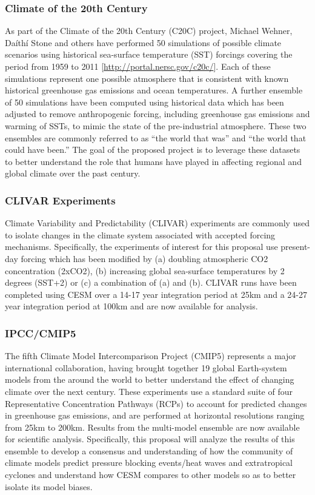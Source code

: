 \documentclass[11pt]{article}
\begin{document}
\subsubsection*{Climate of the 20th Century} \label{sec:EnsembleData}

As part of the Climate of the 20th Century (C20C) project, Michael Wehner, Da\'ith\'i Stone and others have performed 50 simulations of possible climate scenarios using historical sea-surface temperature (SST) forcings covering the period from 1959 to 2011 [\url{http://portal.nersc.gov/c20c/}].  Each of these simulations represent one possible atmosphere that is consistent with known historical greenhouse gas emissions and ocean temperatures.  A further ensemble of 50 simulations have been computed using historical data which has been adjusted to remove anthropogenic forcing, including greenhouse gas emissions and warming of SSTs, to mimic the state of the pre-industrial atmosphere.  These two ensembles are commonly referred to as ``the world that was'' and ``the world that could have been.''  The goal of the proposed project is to leverage these datasets to better understand the role that humans have played in affecting regional and global climate over the past century.

\subsubsection*{CLIVAR Experiments} \label{sec:CLIVAR}

Climate Variability and Predictability (CLIVAR) experiments are commonly used to isolate changes in the climate system associated with accepted forcing mechanisms.  Specifically, the experiments of interest for this proposal use present-day forcing which has been modified by (a) doubling atmospheric CO2 concentration (2xCO2), (b) increasing global sea-surface temperatures by 2 degrees (SST+2) or (c) a combination of (a) and (b).  CLIVAR runs have been completed using CESM over a 14-17 year integration period at 25km and a 24-27 year integration period at 100km and are now available for analysis.

\subsubsection*{IPCC/CMIP5} \label{sec:IPCC-CMIP5}

The fifth Climate Model Intercomparison Project (CMIP5) represents a major international collaboration, having brought together 19 global Earth-system models from the around the world to better understand the effect of changing climate over the next century.  These experiments use a standard suite of four Representative Concentration Pathways (RCPs) to account for predicted changes in greenhouse gas emissions, and are performed at horizontal resolutions ranging from 25km to 200km.  Results from the multi-model ensemble are now available for scientific analysis.  Specifically, this proposal will analyze the results of this ensemble to develop a consensus and understanding of how the community of climate models predict pressure blocking events/heat waves and extratropical cyclones and understand how CESM compares to other models so as to better isolate its model biases.
\end{document}
